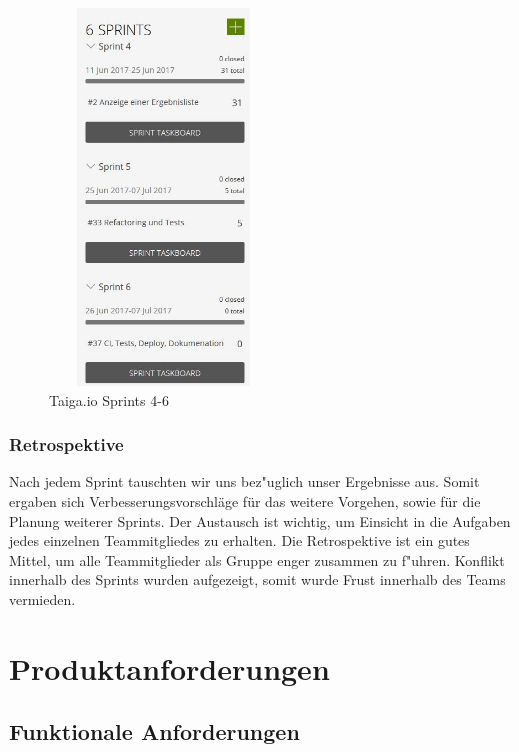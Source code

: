 \documentclass[a4paper, 11pt]{scrreprt}
\begin{document}
\begin{figure} [H]
\begin{center}

\includegraphics[width=6cm, height=10cm]{sprint_1.jpg}
\caption{Taiga.io Sprints 4-6}

\end{center}
\end{figure}

\subsection{Retrospektive}

Nach jedem Sprint tauschten wir uns
bez"uglich unser Ergebnisse aus.
Somit ergaben sich Verbesserungsvorschläge für das weitere Vorgehen,
sowie für die Planung weiterer Sprints.
Der Austausch ist wichtig, um Einsicht in die
Aufgaben jedes einzelnen Teammitgliedes zu erhalten. Die Retrospektive ist ein gutes Mittel, um alle Teammitglieder als Gruppe enger zusammen zu f"uhren. Konflikt innerhalb des Sprints wurden aufgezeigt, somit wurde Frust innerhalb des Teams vermieden.

\chapter{Produktanforderungen}

\section{Funktionale Anforderungen}
\end{document}
